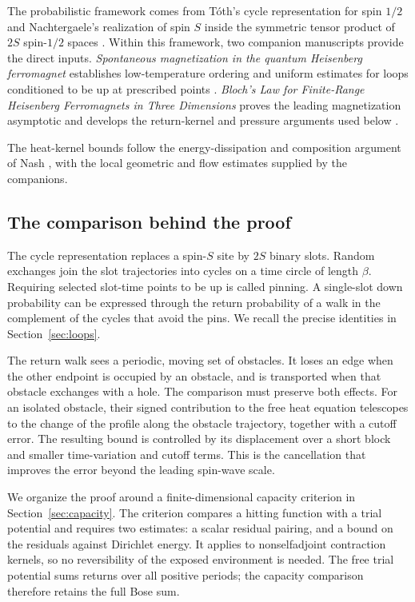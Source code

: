 The probabilistic framework comes from T\'oth's cycle representation for
spin \(1/2\) \cite{Toth1993} and Nachtergaele's realization of spin \(S\)
inside the symmetric tensor product of \(2S\) spin-\(1/2\) spaces
\cite[Section~2.2]{Nachtergaele1994}.
Within this framework, two companion manuscripts provide the direct inputs.
\emph{Spontaneous magnetization in the quantum Heisenberg ferromagnet}
establishes low-temperature ordering and uniform estimates for loops
conditioned to be up at prescribed points
\cite[Theorems~1.1 and~7.5]{Ordering}.
\emph{Bloch's Law for Finite-Range Heisenberg Ferromagnets in Three Dimensions}
proves the leading magnetization asymptotic and develops the return-kernel
and pressure arguments used below \cite[Theorem~1.1 and Sections~2--7]{BlochLaw}.

The heat-kernel bounds follow the energy-dissipation and composition
argument of Nash \cite[pp.~935--936]{Nash1958}, with the local geometric
and flow estimates supplied by the companions.

\subsection{The comparison behind the proof}

The cycle representation replaces a spin-$S$ site by $2S$ binary slots.
Random exchanges join the slot trajectories into cycles on a time
circle of length $\beta$. Requiring selected slot-time points to be up
is called pinning. A single-slot down probability can be expressed
through the return probability of a walk in the complement of the
cycles that avoid the pins. We recall the precise identities in
Section~\ref{sec:loops}.

The return walk sees a periodic, moving set of obstacles. It loses
an edge when the other endpoint is occupied by an obstacle, and is
transported when that obstacle exchanges with a hole. The comparison
must preserve both effects. For an isolated obstacle, their signed
contribution to the free heat equation telescopes to the change of
the profile along the obstacle trajectory, together with a cutoff error.
The resulting bound is controlled by its displacement over a short
block and smaller time-variation and cutoff terms.
This is the cancellation that improves the
error beyond the leading spin-wave scale.

We organize the proof around a finite-dimensional capacity criterion
in Section~\ref{sec:capacity}. The criterion compares a hitting
function with a trial potential and requires two estimates: a scalar
residual pairing, and a bound on the residuals against Dirichlet
energy. It applies to nonselfadjoint contraction kernels, so no
reversibility of the exposed environment is needed. The free trial
potential sums returns over all positive periods; the capacity
comparison therefore retains the full Bose sum.


